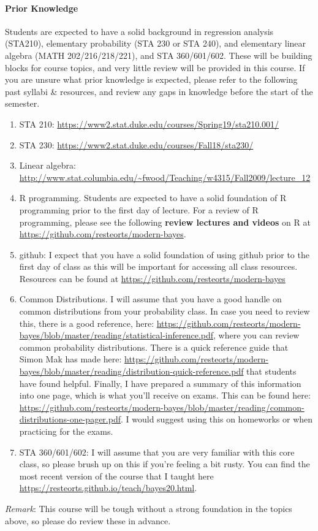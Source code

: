 \documentclass[11pt]{article}
\begin{document}
\paragraph{Prior Knowledge}
Students are expected to have a solid background in regression analysis (STA210), elementary probability (STA 230 or STA 240), and elementary linear algebra (MATH 202/216/218/221), and STA 360/601/602.  These will be building blocks for course topics, and very little review will be provided in this course.  If you are unsure what prior knowledge is expected, please refer to the following past syllabi \& resources, and review any gaps in knowledge before the start of the semester.
\begin{enumerate}
\item STA 210: \url{https://www2.stat.duke.edu/courses/Spring19/sta210.001/}
\item STA 230: \url{https://www2.stat.duke.edu/courses/Fall18/sta230/}
\item Linear algebra: \url{http://www.stat.columbia.edu/~fwood/Teaching/w4315/Fall2009/lecture_12}
\item R programming. Students are expected to have a solid foundation of R programming prior to the first day of lecture. For a review of R programming, please see the following \textbf{review lectures and videos} on R at \url{https://github.com/resteorts/modern-bayes}.
\item github: I expect that you have a solid foundation of using github prior to the first day of class as this will be important for accessing all class resources.  Resources can be found at \url{https://github.com/resteorts/modern-bayes}
\item Common Distributions. I will assume that you have a good handle on common distributions from your probability class. In case you need to review this, there is a good reference, here: \url{https://github.com/resteorts/modern-bayes/blob/master/reading/statistical-inference.pdf}, where you can review common probability distributions. There is a quick reference guide that Simon Mak has made here: \url{https://github.com/resteorts/modern-bayes/blob/master/reading/distribution-quick-reference.pdf} that students have found helpful. Finally, I have prepared a summary of this information into one page, which is what you'll receive on exams. This can be found here: \url{https://github.com/resteorts/modern-bayes/blob/master/reading/common-distributions-one-pager.pdf}. I would suggest using this on homeworks or when practicing for the exams.
\item STA 360/601/602: I will assume that you are very familiar with this core class, so please brush up on this if you're feeling a bit rusty. You can find the most recent version of the course that I taught here \url{https://resteorts.github.io/teach/bayes20.html}.
\end{enumerate}
\emph{Remark}: This course will be tough without a strong foundation in the topics above, so please do review these in advance.
\end{document}
